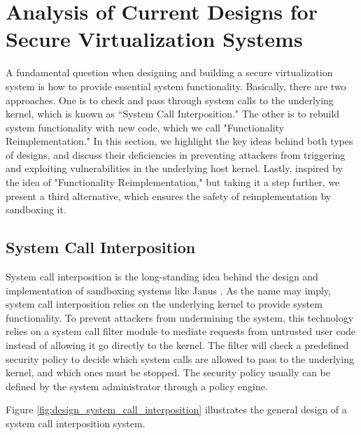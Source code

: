 \section{Analysis of Current Designs for Secure Virtualization Systems}
\label{sec.design}


A fundamental question when designing and building a secure virtualization system
is how to provide essential system functionality.
Basically, there are two approaches.
One is to check and pass through system calls to the underlying kernel,
which is known as ``System Call Interposition."
The other is to rebuild system functionality with new code,
which we call "Functionality Reimplementation."
In this section, we highlight the key ideas behind both types of designs, and
discuss their deficiencies in preventing attackers from triggering and exploiting
vulnerabilities in the underlying host kernel.
Lastly, inspired by the idea of "Functionality Reimplementation," but taking it a step
further, we present a third
alternative, which ensures the safety of reimplementation by sandboxing it.

\subsection{System Call Interposition}
System call interposition is the long-standing idea behind the design and
implementation of sandboxing systems like Janus \cite{Janus0:96, Janus:99}.
As the name may imply, system call interposition relies on the underlying kernel
to provide system functionality. To prevent attackers from undermining the system,
this technology relies on a system call filter module to mediate requests
from untrusted user code instead of allowing it go directly to the kernel.
The filter will check a predefined security policy to decide which system calls are
allowed to pass to the underlying kernel, and which ones must be stopped.
The security policy usually
can be defined by the system administrator through a policy engine.

Figure \ref{fig:design_system_call_interposition} illustrates the general design
of a system call interposition system.

